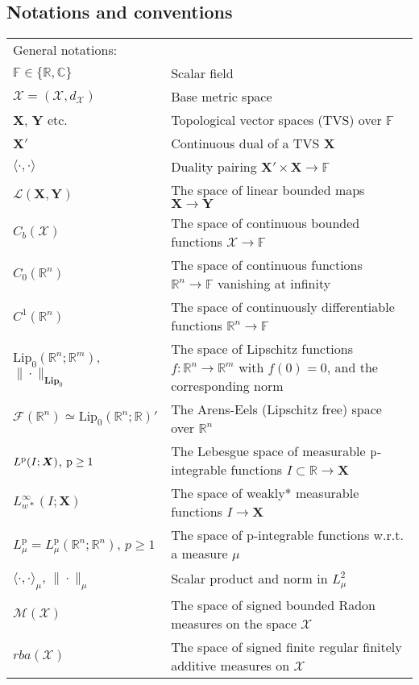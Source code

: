 \documentclass[sn-mathphys-num]{sn-jnl}
\numberwithin{equation}{section}
\theoremstyle{mythm}
\theoremstyle{mydef}
\newcommand{\Lip}{\mathrm{Lip}}
\newcommand{\R}{\mathbb{R}}
\begin{document}
\subsection{Notations and conventions} 


\begin{longtable}[\textwidth]{l p{218pt}}
General notations:\\[0.2cm]
$\mathbb F \in \{\R, \mathbb C\}$ & Scalar field\\
$\mathcal X = (\mathcal X, d_\mathcal X)$ & Base metric space\\
$\bm X$, $\bm Y$ etc. & Topological vector spaces (TVS) over $\mathbb F$ \\
$\bm X'$ & Continuous dual of a TVS $\bm X$\\
$\langle \cdot, \cdot\rangle$ & Duality pairing $\bm X' \times \bm X \to \mathbb F $\\
%
 \(\mathcal L(\bm X, \bm Y)\) & The space of linear bounded maps $\bm X \to \bm Y$\\
$C_b(\mathcal X)$ & The space of continuous bounded \break functions $\mathcal X \to \mathbb F$\\
$C_0(\R^n)$ & The space of continuous functions $\R^n \to \mathbb F$ vanishing at infinity\\
$C^1(\R^n)$ & The space of continuously differentiable functions $\R^n \to \mathbb F$\\
$\Lip_0(\R^n;\R^m)$, \(\displaystyle\|\cdot\|_{\bm{Lip}_0}\) & The space of Lipschitz functions $f\colon \R^n \to \R^m$ with $f(0) = 0$, and the corresponding norm\\
$\bm{\mathcal F}(\R^n)\simeq \Lip_0(\R^n;\R)'$ & The Arens-Eels (Lipschitz free) space over $\R^n$\\
$L^{\rm p}(I;\bm X)$, $\rm p\geq 1$ & The Lebesgue space of measurable $\rm p$-integrable functions $I \subset\R \to \bm X$\\
$L^\infty_{w*}(I;\bm X)$ & The space of weakly* measurable functions $I \to \bm X$\\ 
%
$L^\mathrm{p}_\mu=L^{\mathrm{p}}_\mu(\R^n;\R^n)$, \( p\ge 1 \) & The space of \( \mathrm{p} \)-integrable functions w.r.t. a measure $\mu$\\
$\langle \cdot, \cdot\rangle_\mu$, \( \|\cdot\|_\mu \) & Scalar product and norm in $L^2_\mu$ \\
%
$\mathcal{M}(\mathcal X)$ & The space of
signed bounded Radon measures on the space $\mathcal X$\\
$rba(\mathcal X)$ & The space of signed finite regular finitely additive measures on $\mathcal X$\\

\end{longtable}
\end{document}
